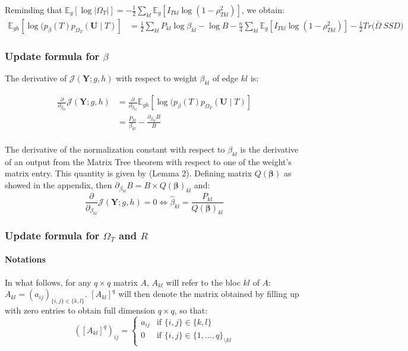 \documentclass[11pt,a4paper]{article}
\newcommand{\betabf}{\boldsymbol{\beta}}
\newcommand{\Ybf}{\boldsymbol{Y}}
\newcommand{\Ubf}{\boldsymbol{U}}
\newcommand{\Esp}{\mathds{E}}
\begin{document}
Reminding that $ \Esp_g[\log|\Omega_T|]=-\frac{1}{2}\sum_{kl} \Esp_g[ I_{Tkl}\log(1-\rho_{Tkl}^2)]$,  we obtain:
\begin{align*}
\Esp_{gh} [\log (p_\beta(T)p_{\Omega_T}(\Ubf\mid T) ] &=\frac{1}{2}\sum_{kl} P_{kl} \log  \beta_{kl} - \log B - \frac{n}{4} \sum_{kl} \Esp_g[ I_{Tkl}\log(1-\rho_{Tkl}^2)]  - \frac{1}{2}Tr\big(\bar{\Omega}\: SSD\big) 
\end{align*}
 
 \subsubsection{Update formula for $\beta$}
 The derivative of $ \mathcal{J}(\Ybf ; g,h)$ with respect to weight $\beta_{kl}$ of edge $kl$ is:
 
 \begin{align*}
\frac{\partial}{\partial_{\beta_{kl}}} \mathcal{J}(\Ybf ; g,h) &=  \frac{\partial}{\partial_{\beta_{kl}}} \Esp_{gh} [\log (p_\beta(T)p_{\Omega_T}(\Ubf\mid T) ] \\
&= \frac{P_{kl}}{\beta_{kl}} - \frac{\partial_{\beta_{kl}} B }{B} \\
\end{align*}

The derivative of the normalization constant with respect to $\beta_{kl}$ is the derivative of an output from the Matrix Tree theorem with respect to one of the weight's matrix entry. This quantity is given by \citet{Meila} (Lemma 2). Defining matrix $Q(\betabf)$ as showed in the appendix, then $\partial_{\beta_{kl}} B = B\times Q(\betabf)_{kl}$ and:
$$\frac{\partial}{\partial_{\beta_{kl}}} \mathcal{J}(\Ybf ; g,h) 
=0 \iff  \boxed{\widehat{\beta}_{kl} = \frac{P_{kl}}{ Q(\betabf)_{kl}} }$$

 \subsubsection{Update formula for $\Omega_T$ and $R$}
 \paragraph{Notations\\}
In what follows, for any $q\times q$  matrix $A$, $A_{kl}$ will refer to the bloc $kl$ of $A$: $A_{kl}=(a_{ij})_{\{i,j\}\in\{k,l\}}$.   $[A_{kl}]^q$ will then denote the matrix obtained by filling up with zero entries to obtain full dimension $q\times q$, so that:
$$([A_{kl}]^q )_{ij}=\left\{ \begin{array}{rl}
a_{ij} & \text{if } \{i,j\}\in\{k,l\}\\
0 &  \text{if } \{i,j\}\in\{1,..., q\}_{\setminus kl}
\end{array}\right.$$
\end{document}
